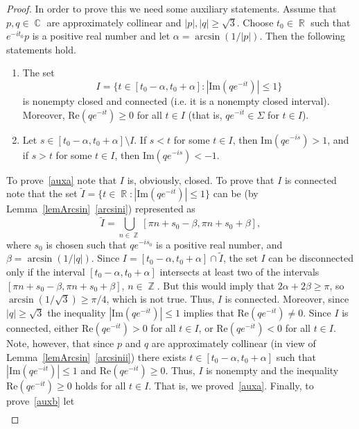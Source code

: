 \documentclass{amsart}
\numberwithin{equation}{section}
\theoremstyle{definition}
\theoremstyle{remark}
\DeclareMathOperator{\CC}{\mathbb C}
\DeclareMathOperator{\RR}{\mathbb R}
\DeclareMathOperator{\ZZ}{\mathbb Z}
\begin{document}
	\begin{proof}
		
		In order to prove this we need some auxiliary statements. Assume that $p,q \in \CC$ are approximately collinear and $|p|, |q| \ge \sqrt{3}$. Choose $t_0 \in \RR$ such that $e^{-it_0} p$ is a positive real number and let $\alpha = \arcsin(1/|p|)$. Then the following statements hold.
		\begin{enumerate}[label=(\alph*)]
			\item\label{auxa} The set 
			\[I = \{t \in [t_0 - \alpha, t_0 + \alpha]: |\mathrm{Im}(qe^{-it})| \le 1\} \]
			is nonempty closed and connected (i.e. it is a nonempty closed interval). Moreover, $\mathrm{Re}(qe^{-it}) \ge 0$ for all $t \in I$ (that is, $qe^{-it} \in \Sigma$ for $t \in I$).
			\item\label{auxb} Let $s \in [t_0 - \alpha, t_0 + \alpha] \setminus I$. If $s < t$ for some $t \in I$, then $\mathrm{Im}(qe^{-is}) > 1$, and if $s > t$ for some $t \in I$, then $\mathrm{Im}(qe^{-is}) < -1$.
		\end{enumerate}
		To prove~\ref{auxa} note that $I$ is, obviously, closed. To prove that $I$ is connected note that the set $\tilde I = \{t \in \RR: |\mathrm{Im}(qe^{-it})| \le 1\}$ can be (by Lemma~\ref{lemArcsin}~\ref{arcsini}) represented as
		\[
		\tilde I = \bigcup_{n \in \ZZ} [\pi n + s_0 - \beta, \pi n + s_0 + \beta],
		\]
		where $s_0$ is chosen such that $qe^{-is_0}$ is a positive real number, and $\beta = \arcsin(1/|q|)$. Since $I = [t_0 - \alpha, t_0 + \alpha] \cap \tilde I$, the set $I$ can be disconnected only if the interval $[t_0 - \alpha, t_0 + \alpha]$ intersects at least two of the intervals $[\pi n + s_0 - \beta, \pi n + s_0 + \beta]$, $n \in \ZZ$. But this would imply that $2 \alpha + 2\beta \ge \pi$, so $\arcsin(1/\sqrt{3})\ge \pi/4$, which is not true. Thus, $I$ is connected. Moreover, since $|q| \ge \sqrt{3}$ the inequality $|\mathrm{Im}(qe^{-it})| \le 1$ implies that $\mathrm{Re}(qe^{-it}) \ne 0$. Since $I$ is connected, either $\mathrm{Re}(qe^{-it}) > 0$ for all $t \in I$, or $\mathrm{Re}(qe^{-it}) < 0$ for all $t \in I$. Note, however, that since $p$ and $q$ are approximately collinear (in view of Lemma~\ref{lemArcsin}~\ref{arcsinii}) there exists $t \in [t_0 - \alpha, t_0 + \alpha]$ such that $|\mathrm{Im}(qe^{-it})| \le 1$ and $\mathrm{Re}(qe^{-it}) \ge 0$. Thus, $I$ is nonempty and the inequality $\mathrm{Re}(qe^{-it}) \ge 0$ holds for all $t \in I$. That is, we proved~\ref{auxa}. Finally, to prove~\ref{auxb} let 
		\[
		\begin{gathered}

\end{gathered}\]
\end{proof}
\end{document}

